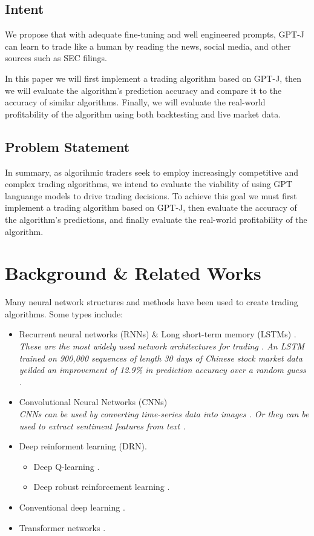 \documentclass[conference]{IEEEtran}
\begin{document}
\subsection{Intent}
We propose that with adequate fine-tuning and well engineered prompts, GPT-J can learn to trade like a human by reading the news, social media, and other sources such as SEC filings.

In this paper we will first implement a trading algorithm based on GPT-J, then we will evaluate the algorithm's prediction accuracy and compare it to the accuracy of similar algorithms. Finally, we will evaluate the real-world profitability of the algorithm using both backtesting and live market data. 

\subsection{Problem Statement}
In summary, as algorihmic traders seek to employ increasingly competitive and complex trading algorithms, we intend to evaluate the viability of using GPT languange models to drive trading decisions. To achieve this goal we must first implement a trading algorithm based on GPT-J, then evaluate the accuracy of the algorithm's predictions, and finally evaluate the real-world profitability of the algorithm.

\section{Background \& Related Works}
Many neural network structures and methods have been used to create trading algorithms. Some types include: 
\begin{itemize}
	\item Recurrent neural networks (RNNs) \& Long short-term memory (LSTMs) \cite{Chen2017}\cite{Mehta2021}.
	      \\\emph{These are the most widely used network architectures for trading \cite{Gu2020}. An LSTM trained on 900,000 sequences of length 30 days of Chinese stock market data yeilded an improvement of 12.9\% in prediction accuracy over a random guess \cite{Chen2015}.}
	\item Convolutional Neural Networks (CNNs) \cite{Gu2020}
	      \\\emph{CNNs can be used by converting time-series data into images \cite{Sezer2018}. Or they can be used to extract sentiment features from text \cite{Shi2020}.}
	\item Deep reinforment learning (DRN).
	      \begin{itemize}
	      	\item Deep Q-learning \cite{Wang2017} \cite{Nan2020}.
	      	\item Deep robust reinforcement learning \cite{Li2019}.
	      \end{itemize}
	\item Conventional deep learning \cite{Day2016}.
	\item Transformer networks \cite{Schmitz2020}.
\end{itemize}
\end{document}
